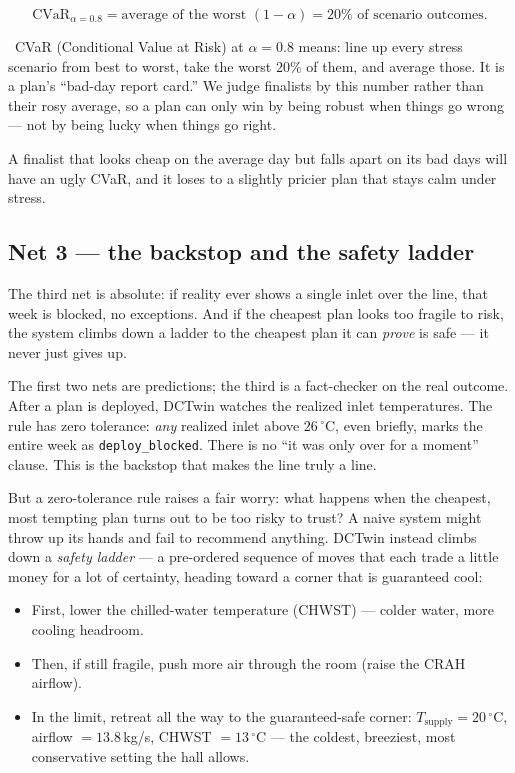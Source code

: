\documentclass[11pt]{report}
\newcommand{\plainwords}[1]{\par\smallskip\noindent{\itshape In plain words.}~#1\par\smallskip}
\begin{document}
\begin{equation}\label{eq:cvar}
\text{CVaR}_{\alpha=0.8} = \text{average of the worst } (1-\alpha) = 20\% \text{ of scenario outcomes.}
\end{equation}
\plainwords{CVaR (Conditional Value at Risk) at $\alpha = 0.8$ means: line up every stress scenario from best to worst, take the worst $20\%$ of them, and average those. It is a plan's ``bad-day report card.'' We judge finalists by this number rather than their rosy average, so a plan can only win by being robust when things go wrong --- not by being lucky when things go right.}

A finalist that looks cheap on the average day but falls apart on its bad days will have an ugly CVaR, and it loses to a slightly pricier plan that stays calm under stress.

\subsection{Net 3 --- the backstop and the safety ladder}

\begin{keyidea}
The third net is absolute: if reality ever shows a single inlet over the line, that week is blocked, no exceptions. And if the cheapest plan looks too fragile to risk, the system climbs down a ladder to the cheapest plan it can \emph{prove} is safe --- it never just gives up.
\end{keyidea}

The first two nets are predictions; the third is a fact-checker on the real outcome. After a plan is deployed, DCTwin watches the realized inlet temperatures. The rule has zero tolerance: \emph{any} realized inlet above $26\,^\circ$C, even briefly, marks the entire week as \texttt{deploy\_blocked}. There is no ``it was only over for a moment'' clause. This is the backstop that makes the line truly a line.

But a zero-tolerance rule raises a fair worry: what happens when the cheapest, most tempting plan turns out to be too risky to trust? A naive system might throw up its hands and fail to recommend anything. DCTwin instead climbs down a \emph{safety ladder} --- a pre-ordered sequence of moves that each trade a little money for a lot of certainty, heading toward a corner that is guaranteed cool:

\begin{itemize}
  \item First, lower the chilled-water temperature (CHWST) --- colder water, more cooling headroom.
  \item Then, if still fragile, push more air through the room (raise the CRAH airflow).
  \item In the limit, retreat all the way to the guaranteed-safe corner: $T_{\text{supply}} = 20\,^{\circ}$C, airflow $= 13.8$\,kg/s, CHWST $= 13\,^{\circ}$C --- the coldest, breeziest, most conservative setting the hall allows.
\end{itemize}
\end{document}
